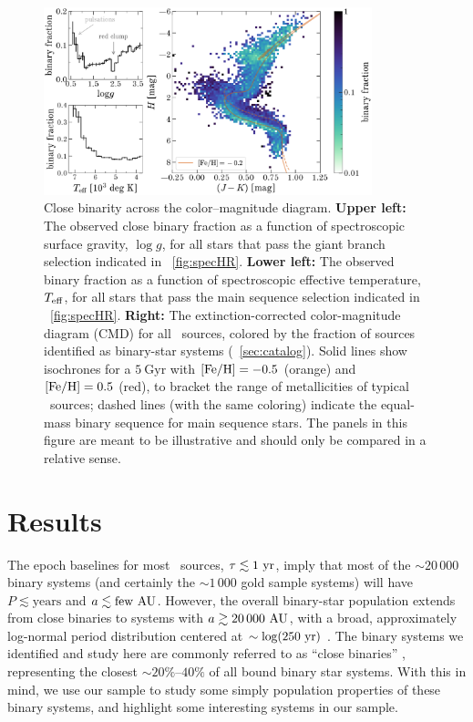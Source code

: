 \documentclass[modern]{aastex63}
\begin{document}
\begin{figure}[!t]
    \begin{center}
    \includegraphics[width=0.85\textwidth]{binary-fraction.pdf}
    \end{center}
    \caption{%
    Close binarity across the color--magnitude diagram.
    \textbf{Upper left:} The observed close binary fraction as a function of
    spectroscopic surface gravity, $\log g$, for all stars that pass the
    giant branch selection indicated in \figurename~\ref{fig:specHR}.
    \textbf{Lower left:} The observed binary fraction as a function of
    spectroscopic effective temperature, $T_{\rm eff}$, for all stars that pass
    the main sequence selection indicated in \figurename~\ref{fig:specHR}.
    \textbf{Right:} The extinction-corrected  color-magnitude
    diagram (CMD) for all \apogee\ sources, colored by the fraction of sources
    identified as binary-star systems (\sectionname~\ref{sec:catalog}).
    Solid lines show  isochrones for a $5~\mathrm{Gyr}$ with
    ${[{\rm Fe}/{\rm H}]} = -0.5$ (orange) and ${[{\rm Fe}/{\rm H}]} = 0.5$ (red), to bracket the range of
    metallicities of typical \apogee\ sources; dashed lines (with the same
    coloring) indicate the equal-mass binary sequence for main sequence stars.
    The panels in this figure are meant to be illustrative and should only be
    compared in a relative sense.
    \label{fig:binary-CMD}
    }
\end{figure}


\section{Results} \label{sec:results}

The epoch baselines for most \apogee\ sources, $\tau \lesssim 1~\mathrm{yr}$, imply that
most of the $\sim 20\,000$ binary systems (and certainly the $\sim 1\,000$ gold
sample systems) will have $P \lesssim \mathrm{years}$ and $a \lesssim
\mathrm{few}~\mathrm{AU}$.
However, the overall binary-star population extends from close binaries to
systems with $a\gtrsim 20\,000~\mathrm{AU}$, with a broad, approximately log-normal
period distribution centered at $\sim \log(250~\mathrm{yr})$ \citep{Raghavan:2010}.
The binary systems we identified and study here are commonly referred to as
``close binaries'' \citep{Moe:2018, Badenes:2018}, representing the closest
$\sim 20\%$--$40\%$ of all bound binary star systems.
With this in mind, we use our sample to study some simply population properties
of these binary systems, and highlight some interesting systems in our sample.
\end{document}
